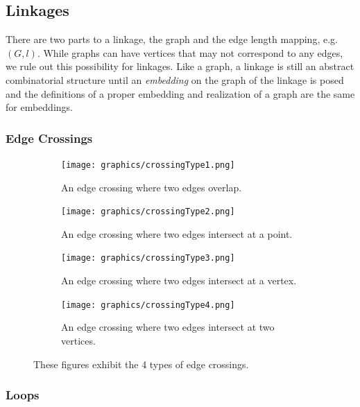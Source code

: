 \subsection{Linkages}
There are two parts to a linkage, the graph and the edge length mapping, e.g. $(G,l)$.  While 
graphs can have 
vertices that may not correspond to any edges, we rule out 
this possibility for linkages.  Like a graph, a linkage is still an abstract combinatorial 
structure until an \textit{embedding} on the 
graph of the linkage is posed and the definitions of a proper embedding and realization of a  graph 
are the same for embeddings.  
\subsubsection{Edge Crossings}
\begin{figure}[H]
\begin{center}
  \begin{subfigure}[b]{0.24\textwidth}
	  \texttt{[image: graphics/crossingType1.png]}
	  \caption{An edge crossing where two edges overlap.}
	  \label{fig:ch1-linkages-1-1}
  \end{subfigure}
  \begin{subfigure}[b]{0.24\textwidth}
	  \texttt{[image: graphics/crossingType2.png]}
	  \caption{An edge crossing where two edges intersect at a point.}
	  \label{fig:ch1-linkages-1-2}
  \end{subfigure}
  \begin{subfigure}[b]{0.24\textwidth}
	  \texttt{[image: graphics/crossingType3.png]}
	  \caption{An edge crossing where two edges intersect at a vertex.}
	  \label{fig:ch1-linkages-1-3}
  \end{subfigure}
  \begin{subfigure}[b]{0.24\textwidth}
	  \texttt{[image: graphics/crossingType4.png]}
	  \caption{An edge crossing where two edges intersect at two vertices.}
	  \label{fig:ch1-linkages-1-4}
  \end{subfigure}
\end{center} 
\caption{These figures exhibit the 4 types of edge crossings.}\label{fig:ch1-linkages-1}
\end{figure}
\subsubsection{Loops}
